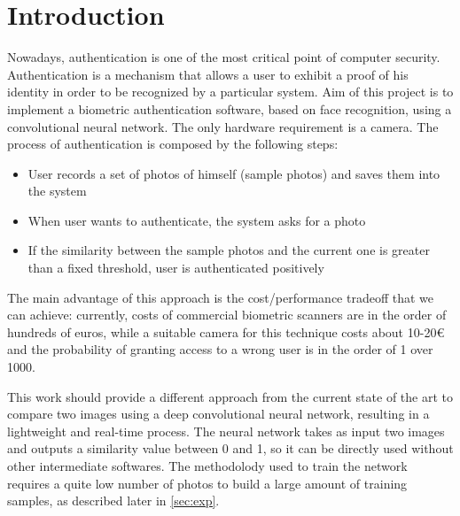 \section{Introduction}

Nowadays, authentication is one of the most critical point of computer security. Authentication is a mechanism that allows a user to exhibit a proof of his identity in order to be recognized by a particular system. Aim of this project is to implement a biometric authentication software, based on face recognition, using a convolutional neural network. The only hardware requirement is a camera. The process of authentication is composed by the following steps:
\begin{itemize}
\item User records a set of photos of himself (sample photos) and saves them into the system
\item When user wants to authenticate, the system asks for a photo
\item If the similarity between the sample photos and the current one is greater than a fixed threshold, user is authenticated positively
\end{itemize}
The main advantage of this approach is the cost/performance tradeoff that we can achieve: currently, costs of commercial biometric scanners are in the order of hundreds of euros, while a suitable camera for this technique costs about 10-20\euro \, and the probability of granting access to a wrong user is in the order of 1 over 1000.

This work should provide a different approach from the current state of the art to compare two images using a deep convolutional neural network, resulting in a lightweight and real-time process. The neural network takes as input two images and outputs a similarity value between 0 and 1, so it can be directly used without other intermediate softwares. The methodolody used to train the network requires a quite low number of photos to build a large amount of training samples, as described later in \ref{sec:exp}.

